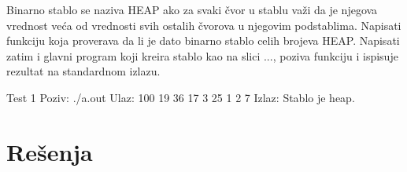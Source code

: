 \begin{Answer}[ref=714]
\end{Answer}


\begin{Exercise}[label=715]
Binarno stablo se naziva HEAP ako za svaki čvor u stablu važi da je njegova vrednost veća od vrednosti svih ostalih čvorova u njegovim podstablima. Napisati funkciju  koja proverava da li je dato binarno stablo celih brojeva HEAP. Napisati zatim i glavni program koji kreira stablo kao na slici ..., poziva funkciju  i ispisuje rezultat na standardnom izlazu. 

\begin{miditest}
\begin{test}{Test 1}
Poziv: ./a.out
Ulaz: 
	100 19 36 17 3 25 1 2 7
Izlaz: 
	Stablo je heap.
\end{test}
\end{miditest}

\end{Exercise}

\begin{Answer}[ref=715]
\end{Answer}


\section{Rešenja}
\shipoutAnswer
